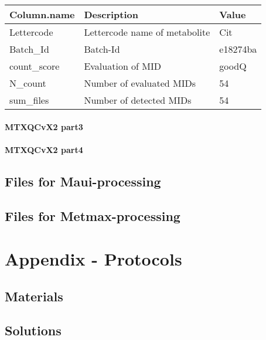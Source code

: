 \documentclass[]{book}
\begin{document}
\begin{tabu} to 
\toprule
Column.name & Description & Value\\
\midrule
{}  Lettercode & Lettercode name of metabolite & Cit\\
Batch\_Id & Batch-Id & e18274ba\\
  count\_score & Evaluation of MID & goodQ\\
N\_count & Number of evaluated MIDs & 54\\
  sum\_files & Number of detected MIDs & 54\\
\bottomrule
\end{tabu}

\hypertarget{mtxqcvx2-part3}{%
\subsubsection{MTXQCvX2 part3}\label{mtxqcvx2-part3}}

\hypertarget{mtxqcvx2-part4}{%
\subsubsection{MTXQCvX2 part4}\label{mtxqcvx2-part4}}

\hypertarget{files-for-maui-processing}{%
\section{Files for Maui-processing}\label{files-for-maui-processing}}

\hypertarget{files-for-metmax-processing}{%
\section{Files for Metmax-processing}\label{files-for-metmax-processing}}

\hypertarget{protocols}{%
\chapter{Appendix - Protocols}\label{protocols}}

\hypertarget{materials}{%
\section{Materials}\label{materials}}

\hypertarget{solutions}{%
\section{Solutions}\label{solutions}}
\end{document}

